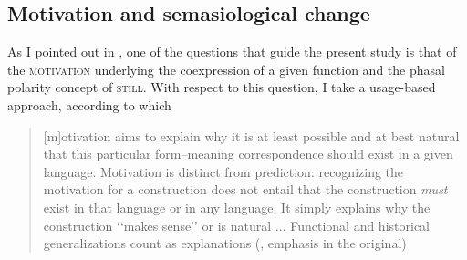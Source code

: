 \begin{exe}
	\ex\label{exUsesConcessives}
	\begin{xlist}
	\end{xlist}
\end{exe}

\subsection{Motivation and semasiological change}
\label{sectionSemasiologicalChange}
As I pointed out in , one of the questions that guide the present study is that of the \textsc{motivation} underlying the coexpression of a given function and the phasal polarity concept of \textsc{still}. With respect to this question, I take a usage-based approach, according to which 

\begin{quote}
[m]otivation aims to explain why it is at least possible and at best natural that this particular form–meaning correspondence should exist in a given language. Motivation is distinct from prediction: recognizing the motivation for a construction does not entail that the construction \textit{must} exist in that language or in any language. It simply explains why the construction \lq\lq{}makes sense\rq\rq{ }or is natural ... Functional and historical generalizations count as explanations (\cite[217]{Goldberg2006}, emphasis in the original)
\end{quote}

